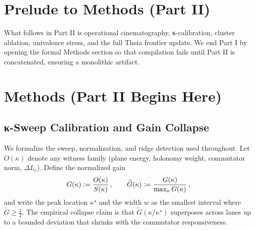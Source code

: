 \documentclass[11pt]{article}
\newcommand{\1}{\mathbf{1}}
\newcommand{\defeq}{\vcentcolon=}
\newcommand{\wt}{\widetilde}
\newcommand{\Slack}{S}
\newcommand{\Lc}{L_c}
\begin{document}
\section{Prelude to Methods (Part II)}
What follows in Part II is operational cinematography, κ-calibration, cluster ablation, univalence stress, and the full Theia frontier update. We end Part I by opening the formal Methods section so that compilation fails until Part II is concatenated, ensuring a monolithic artifact.

\section{Methods (Part II Begins Here)}\label{sec:methods-part2}
\subsection{κ-Sweep Calibration and Gain Collapse}
We formalize the sweep, normalization, and ridge detection used throughout. Let \(O(\kappa)\) denote any witness family (plane energy, holonomy weight, commutator norm, \(\Delta \Lc\)). Define the normalized gain
\begin{equation}
G(\kappa)\defeq \frac{O(\kappa)}{\Slack(\kappa)}\,,\qquad \wt{G}(\kappa)\defeq \frac{G(\kappa)}{\max_{\kappa} G(\kappa)}\,,
\end{equation}
and write the peak location \(\kappa^\star\) and the width \(w\) as the smallest interval where \(\wt{G}\ge \tfrac12\). The empirical collapse claim is that \(\wt{G}(\kappa/\kappa^\star)\) superposes across lanes up to a bounded deviation that shrinks with the commutator responsiveness.
\end{document}
